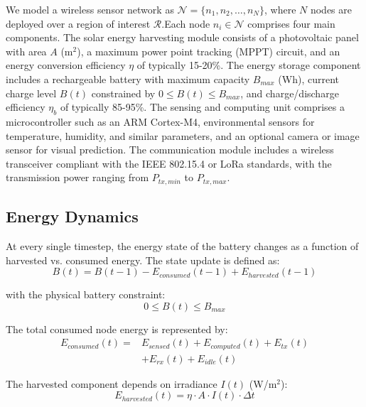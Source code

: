 \documentclass[journal]{IEEEtran}
\begin{document}
We model a wireless sensor network as $\mathcal{N} = \{n_1, n_2, \ldots, n_N\}$, where $N$ nodes are deployed over a region of interest $\mathcal{R}$.Each node $n_i \in \mathcal{N}$ comprises four main components. The solar energy harvesting module consists of a photovoltaic panel with area $A$ (m$^2$), a maximum power point tracking (MPPT) circuit, and an energy conversion efficiency $\eta$ of typically 15-20\%. The energy storage component includes a rechargeable battery with maximum capacity $B_{max}$ (Wh), current charge level $B(t)$ constrained by $0 \leq B(t) \leq B_{max}$, and charge/discharge efficiency $\eta_b$ of typically 85-95\%. The sensing and computing unit comprises a microcontroller such as an ARM Cortex-M4, environmental sensors for temperature, humidity, and similar parameters, and an optional camera or image sensor for visual prediction. The communication module includes a wireless transceiver compliant with the IEEE 802.15.4 or LoRa standards, with the transmission power ranging from $P_{tx, min}$ to $P_{tx, max}$.

\subsection{Energy Dynamics}

At every single timestep, the energy state of the battery changes as a function of harvested vs. consumed energy. The state update is defined as:\cite{ref8}
\begin{equation}
B(t) = B(t-1) - E_{consumed}(t-1) + E_{harvested}(t-1)
\end{equation}

with the physical battery constraint:
\begin{equation}
0 \leq B(t) \leq B_{max}
\end{equation}

The total consumed node energy is represented by:
\begin{equation}
\begin{aligned}
E_{consumed}(t) = {}& E_{sensed}(t) + E_{computed}(t) + E_{tx}(t) \\
& + E_{rx}(t) + E_{idle}(t)
\end{aligned}
\end{equation}

The harvested component depends on irradiance $I(t)$ (W/m$^2$):
\begin{equation}
E_{harvested}(t) = \eta \cdot A \cdot I(t) \cdot \Delta t
\end{equation}
\end{document}
